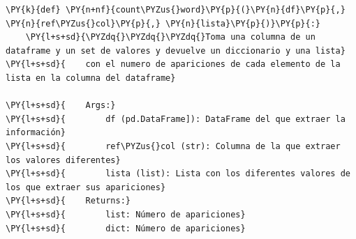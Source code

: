     \begin{tcolorbox}[breakable, size=fbox, boxrule=1pt, pad at break*=1mm,colback=cellbackground, colframe=cellborder]
\begin{Verbatim}[commandchars=\\\{\}]
\PY{k}{def} \PY{n+nf}{count\PYZus{}word}\PY{p}{(}\PY{n}{df}\PY{p}{,} \PY{n}{ref\PYZus{}col}\PY{p}{,} \PY{n}{lista}\PY{p}{)}\PY{p}{:}
    \PY{l+s+sd}{\PYZdq{}\PYZdq{}\PYZdq{}Toma una columna de un dataframe y un set de valores y devuelve un diccionario y una lista}
\PY{l+s+sd}{    con el numero de apariciones de cada elemento de la lista en la columna del dataframe}

\PY{l+s+sd}{    Args:}
\PY{l+s+sd}{        df (pd.DataFrame]): DataFrame del que extraer la información}
\PY{l+s+sd}{        ref\PYZus{}col (str): Columna de la que extraer los valores diferentes}
\PY{l+s+sd}{        lista (list): Lista con los diferentes valores de los que extraer sus apariciones}
\PY{l+s+sd}{    Returns:}
\PY{l+s+sd}{        list: Número de apariciones}
\PY{l+s+sd}{        dict: Número de apariciones}


\end{Verbatim}
\end{tcolorbox}
